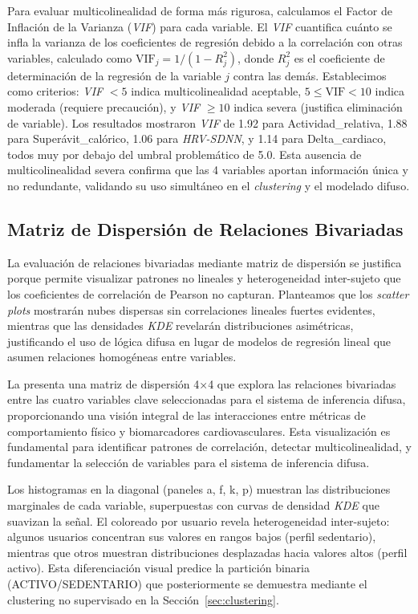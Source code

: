 Para evaluar multicolinealidad de forma más rigurosa, calculamos el Factor de Inflación de la Varianza (\textit{VIF}) para cada variable. El \textit{VIF} cuantifica cuánto se infla la varianza de los coeficientes de regresión debido a la correlación con otras variables, calculado como $\text{VIF}_j = 1/(1 - R^2_j)$, donde $R^2_j$ es el coeficiente de determinación de la regresión de la variable $j$ contra las demás. Establecimos como criterios: \textit{VIF} $< 5$ indica multicolinealidad aceptable, $5 \leq \text{VIF} < 10$ indica moderada (requiere precaución), y \textit{VIF} $\geq 10$ indica severa (justifica eliminación de variable). Los resultados mostraron \textit{VIF} de 1.92 para Actividad\_relativa, 1.88 para Superávit\_calórico, 1.06 para \textit{HRV-SDNN}, y 1.14 para Delta\_cardiaco, todos muy por debajo del umbral problemático de 5.0. Esta ausencia de multicolinealidad severa confirma que las 4 variables aportan información única y no redundante, validando su uso simultáneo en el \textit{clustering} y el modelado difuso.

\subsection{Matriz de Dispersión de Relaciones Bivariadas}

La evaluación de relaciones bivariadas mediante matriz de dispersión se justifica porque permite visualizar patrones no lineales y heterogeneidad inter-sujeto que los coeficientes de correlación de Pearson no capturan. Planteamos que los \textit{scatter plots} mostrarán nubes dispersas sin correlaciones lineales fuertes evidentes, mientras que las densidades \textit{KDE} revelarán distribuciones asimétricas, justificando el uso de lógica difusa en lugar de modelos de regresión lineal que asumen relaciones homogéneas entre variables.

La  presenta una matriz de dispersión 4×4 que explora las relaciones bivariadas entre las cuatro variables clave seleccionadas para el sistema de inferencia difusa, proporcionando una visión integral de las interacciones entre métricas de comportamiento físico y biomarcadores cardiovasculares. Esta visualización es fundamental para identificar patrones de correlación, detectar multicolinealidad, y fundamentar la selección de variables para el sistema de inferencia difusa.

Los histogramas en la diagonal (paneles a, f, k, p) muestran las distribuciones marginales de cada variable, superpuestas con curvas de densidad \textit{KDE} que suavizan la señal. El coloreado por usuario revela heterogeneidad inter-sujeto: algunos usuarios concentran sus valores en rangos bajos (perfil sedentario), mientras que otros muestran distribuciones desplazadas hacia valores altos (perfil activo). Esta diferenciación visual predice la partición binaria (ACTIVO/SEDENTARIO) que posteriormente se demuestra mediante el clustering no supervisado en la Sección~\ref{sec:clustering}.

